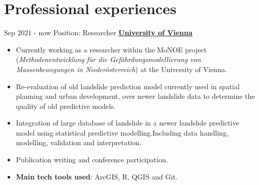 \documentclass[letterpaper]{twentysecondcv} %
\begin{document}
\makeprofile %
 

\section{Professional experiences}

\begin{twenty} %
\twentyitem
    	{Sep 2021 -}
		{now}
        {Position: Researcher \color{black}} 
        {\href{https://geographie.univie.ac.at/arbeitsgruppen/engage-geomorphologische-systeme-und-risikoforschung/}{\normalsize  \textbf{\underline{University of Vienna}}}}
        {}
        {\begin{itemize}
        \item Currently working as a researcher within the MoNOE project (\textit{Methodenentwicklung für die Gefährdungsmodellierung von Massenbewegungen in Niederösterreich}) at the University of Vienna.
        \item Re-evaluation of old landslide prediction model currently used in spatial planning and urban development, over newer landslide data to determine the quality of old predictive models.
        \item Integration of large database of landslide in a newer landslide predictive model using statistical predictive modelling.Including data handling, modelling, validation and interpretation. 
        \item Publication writing and conference participation. 
        \item \textbf{Main tech tools used}: ArcGIS, R, QGIS and Git. 
        \end{itemize}}
        \vspace{7mm}\\
        



\end{twenty}
\end{document}
